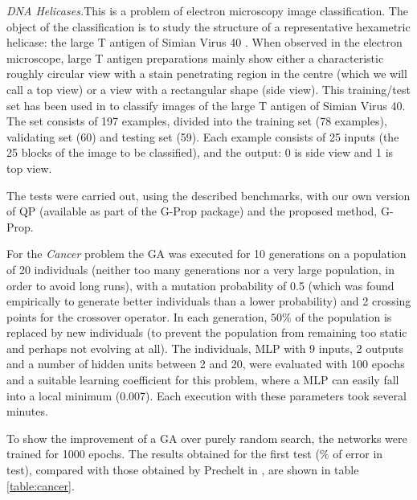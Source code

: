\documentclass{elsart}
\begin{document}
\emph{DNA Helicases.}This is a problem of electron microscopy image classification. The object of the classification is to study the structure of a representative hexametric helicase: the large T antigen of Simian Virus 40 \cite{Tantigen}. When observed in the electron microscope, large T antigen preparations mainly show either a characteristic roughly circular view with a stain penetrating region in the centre (which we will call a top view) or a view with a rectangular shape (side view).
This training/test set has been used in \cite{heliNPL} to classify images of the large T antigen of Simian Virus 40.
The set consists of 197 examples, divided into the training set (78 examples), validating set (60) and testing set (59).
Each example consists of 25 inputs (the 25 blocks of the image to be classified), and the output: 0 is side view and 1 is top view.

The tests were carried out, using the described benchmarks, with our own version of QP (available as part of the G-Prop package) and the proposed method, G-Prop.

For the \emph{Cancer} problem the GA was executed for 10 generations on a population of 20 individuals (neither too many generations nor a very large population, in order to avoid long runs), with a mutation probability of 0.5 (which was found empirically to generate better individuals than a lower probability) and 2 crossing points for the crossover operator. In each generation, $50\%$ of the population is replaced by new individuals (to prevent the population from remaining too static and perhaps not evolving at all).
The individuals, MLP with 9 inputs, 2 outputs and a number of hidden units between 2 and 20, were evaluated with 100 epochs and a suitable learning coefficient for this problem, where a MLP can easily fall into a local minimum (0.007).
Each execution with these parameters took several minutes.

To show the improvement of a GA over purely random search, the networks were trained for 1000 epochs. 
The results obtained for the first test ($\%$ of error in test), compared with those obtained by Prechelt in \cite{Prechelt94c}, are shown in table \ref{table:cancer}.
\end{document}
